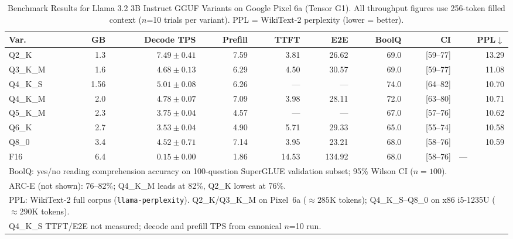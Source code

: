 \documentclass[conference]{IEEEtran}
\begin{document}
\begin{table}[t]
\centering
\caption{Benchmark Results for Llama 3.2 3B Instruct GGUF Variants on Google Pixel 6a (Tensor G1).
All throughput figures use 256-token filled context ($n$=10 trials per variant). PPL = WikiText-2 perplexity (lower = better).}
\label{tab:main_results}
\setlength{\tabcolsep}{3pt}
\begin{tabular}{lrrrrrrrr}
\toprule
\textbf{Var.} & \textbf{GB} & \textbf{Decode TPS} &
\textbf{Prefill} & \textbf{TTFT} & \textbf{E2E} & \textbf{BoolQ} & \textbf{CI} & \textbf{PPL$\downarrow$} \\
\midrule
Q2\_K    & 1.3 & $7.49 \pm 0.41$ & 7.59  & 3.81  & 26.62  & 69.0  & [59--77] & 13.29 \\
Q3\_K\_M & 1.6 & $4.68 \pm 0.13$ & 6.29  & 4.50  & 30.57  & 69.0  & [59--77] & 11.08 \\
Q4\_K\_S & 1.56 & $5.01 \pm 0.08$ & 6.26 & --- & --- & 74.0 & [64--82] & 10.70 \\
Q4\_K\_M & 2.0 & $4.78 \pm 0.07$ & 7.09  & 3.98  & 28.11  & 72.0  & [63--80] & 10.71 \\
Q5\_K\_M & 2.3 & $3.75 \pm 0.04$ & 4.57  & ---   & ---    & 67.0  & [57--76] & 10.62 \\
Q6\_K    & 2.7 & $3.53 \pm 0.04$ & 4.90  & 5.71  & 29.33  & 65.0  & [55--74] & 10.58 \\
Q8\_0    & 3.4 & $4.52 \pm 0.71$ & 7.14  & 3.95  & 23.21  & 68.0  & [58--76] & 10.59 \\
F16      & 6.4 & $0.15 \pm 0.00$ & 1.86  & 14.53 & 134.92 & 68.0  & [58--76] & \multicolumn{1}{l}{---} \\
\midrule
\multicolumn{9}{l}{\small BoolQ: yes/no reading comprehension accuracy on 100-question SuperGLUE validation subset; 95\% Wilson CI ($n{=}100$).}\\
\multicolumn{9}{l}{\small ARC-E (not shown): 76--82\%; Q4\_K\_M leads at 82\%, Q2\_K lowest at 76\%.}\\
\multicolumn{9}{l}{\small PPL: WikiText-2 full corpus (\texttt{llama-perplexity}). Q2\_K/Q3\_K\_M on Pixel~6a (${\approx}285$K tokens); Q4\_K\_S–Q8\_0 on x86 i5-1235U (${\approx}290$K tokens).}\\
\multicolumn{9}{l}{\small Q4\_K\_S TTFT/E2E not measured; decode and prefill TPS from canonical $n$=10 run.}\\
\bottomrule
\end{tabular}
\end{table}
\end{document}
